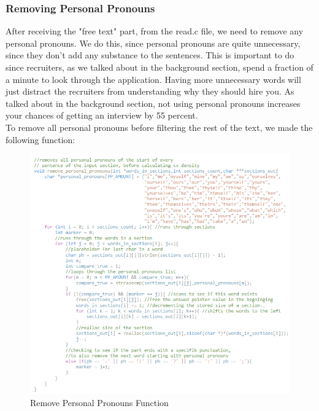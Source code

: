 \subsubsection{Removing Personal Pronouns}
After receiving the "free text" part, from the read.c file, we need to remove any personal pronouns.
We do this, since personal pronouns are quite unnecessary, since they don't add any substance to the sentences.
This is important to do since recruiters, as we talked about in the background section, spend a fraction of a minute
to look through the application. 
Having more unnecessary words will just distract the recruiters from understanding why they should hire you.
As talked about in the background section, not using personal pronouns increases your
chances of getting an interview by 55 percent.
\\
To remove all personal pronouns before filtering the rest of the text, we made the following function:
\begin{figure}[H]
  \centering
  \includegraphics[scale = 1]{figures/personal_pronoun_v2.png}
  \caption{Remove Personal Pronouns Function}\label{fig:personal_pronoun_v2}
\end{figure}

